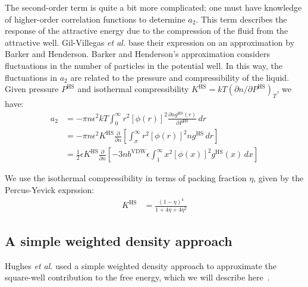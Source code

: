 \documentclass[letterpaper,twocolumn,amsmath,amssymb,pre,aps,10pt]{revtex4-1}
\begin{document}
The second-order term is quite a bit more complicated; one must have
knowledge of higher-order correlation functions to determine
$a_2$. This term describes the response of the attractive energy due
to the compression of the fluid from the attractive well. Gil-Villegas
\emph{et al.} base their expression on an approximation by Barker and
Henderson\cite{barker1967-SW-perturbation}. Barker and Henderson's
approximation considers fluctuations in the number of particles in the
potential well. In this way, the fluctuations in $a_2$ are related to
the pressure and compressibility of the liquid. Given pressure
$P^\text{HS}$ and isothermal compressibility $K^\text{HS} =
kT\left(\partial n  /\partial P^\text{HS}\right)_T$, we have:
\begin{align}
  a_2 &= -\pi n \epsilon^2kT\int_0^\infty r^2\left[\phi(r)\right]^2\frac{\partial n  g^\text{HS}(r)}{\partial P^\text{HS}}\,dr \\
  &= -\pi n \epsilon^2K^\text{HS}\frac{\partial}{\partial n }\left[\int_\sigma^\infty r^2\left[\phi(r)\right]^2 n  g^\text{HS}\,dr\right] \\
  &= \frac{1}{2}\epsilon K^\text{HS}\frac{\partial}{\partial n }\left[-3 n  b^\text{VDW}\epsilon\int_1^\infty x^2\left[\phi(x)\right]^2 g^\text{HS}(x)\,dx \right]
\end{align}

We use the isothermal compressibility in terms of packing fraction $\eta$, given by the Percus-Yevick exprssion\cite{barker1976liquid}:
\begin{align}
  K^\text{HS} &= \frac{\left(1 - \eta\right)^4}{1 + 4\eta + 4\eta^2}
\end{align}

\subsection{A simple weighted density approach}

Hughes \emph{et al.} used a simple weighted density approach to
approximate the square-well contribution to the free energy, which we
will describe here~\cite{hughes2013classical}.
\end{document}
